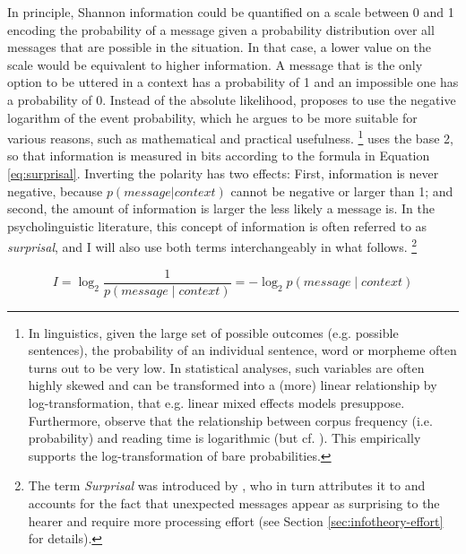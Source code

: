 In principle, Shannon information could be quantified on a scale between 0 and 1 encoding the probability of a message given a probability distribution over all messages that are possible in the situation. In that case, a lower value on the scale would be equivalent to higher information. A message that is the only option to be uttered in a context has a probability of 1 and an impossible one has a probability of 0. Instead of the absolute likelihood, \citeauthor{shannon1948} proposes to use the negative logarithm of the event probability, which he argues to be more suitable for various reasons, such as mathematical and practical usefulness.%
%
\footnote{In linguistics, given the large set of possible outcomes (e.g. possible sentences), the probability of an individual sentence, word or morpheme often turns out to be very low. In statistical analyses, such variables are often highly skewed and can be transformed into a (more) linear relationship by log-transformation, that e.g. linear mixed effects models \citep{bates.etal2015} presuppose. Furthermore, \citet{smith.levy2013}  observe that the relationship between corpus frequency (i.e. probability) and reading time is logarithmic (but cf. \citet{brothers.kuperberg2019}). This empirically supports the log-transformation of bare probabilities.  }\afterfn%
%
\citeauthor{shannon1948} uses the base 2, so that information is measured in bits according to the formula in Equation \ref{eq:surprisal}. Inverting the polarity has two effects: First, information is never negative, because $p(message|context)$ cannot be negative or larger than 1; and second, the amount of information is larger the less likely a message is. In the psycholinguistic literature, this concept of information is often referred to as \textit{surprisal}, and I will also use both terms interchangeably in what follows.%
%
\footnote{The term \textit{Surprisal} was introduced by \citet{hale2001}, who in turn attributes it to \citet{attneave1959} and accounts for the fact that unexpected messages appear as surprising to the hearer and require more processing effort (see Section \ref{sec:infotheory-effort} for details).}\afterfn%

\begin{equation}
I = \log_2 \frac{1}{p(message\mathbin{|}context)} = - \log_2 p(message\mathbin{|}context) \label{eq:surprisal}
\end{equation}

